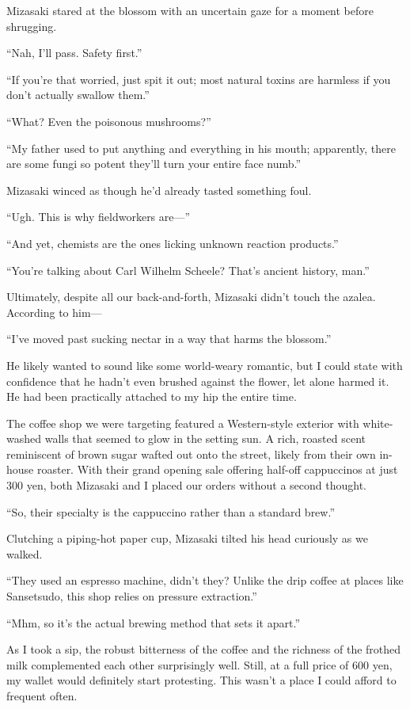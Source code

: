 \documentclass[
    a4paper,
    12pt,
    twoside,
    openany,
    UTF8,
    fontset=windows
]{ctexbook}
\begin{document}
Mizasaki stared at the blossom with an uncertain gaze for a moment before shrugging.

``Nah, I'll pass. Safety first.''

``If you're that worried, just spit it out; most natural toxins are harmless if you don't actually swallow them.''

``What? Even the poisonous mushrooms?''

``My father used to put anything and everything in his mouth; apparently, there are some fungi so potent they'll turn your entire face numb.''

Mizasaki winced as though he'd already tasted something foul.

``Ugh. This is why fieldworkers are---''

``And yet, chemists are the ones licking unknown reaction products.''

``You're talking about Carl Wilhelm Scheele? That's ancient history, man.''

Ultimately, despite all our back-and-forth, Mizasaki didn't touch the azalea. According to him---

``I've moved past sucking nectar in a way that harms the blossom.''

He likely wanted to sound like some world-weary romantic, but I could state with confidence that he hadn't even brushed against the flower, let alone harmed it. He had been practically attached to my hip the entire time.

The coffee shop we were targeting featured a Western-style exterior with white-washed walls that seemed to glow in the setting sun. A rich, roasted scent reminiscent of brown sugar wafted out onto the street, likely from their own in-house roaster. With their grand opening sale offering half-off cappuccinos at just 300 yen, both Mizasaki and I placed our orders without a second thought.

``So, their specialty is the cappuccino rather than a standard brew.''

Clutching a piping-hot paper cup, Mizasaki tilted his head curiously as we walked.

``They used an espresso machine, didn't they? Unlike the drip coffee at places like Sansetsudo, this shop relies on pressure extraction.''

``Mhm, so it's the actual brewing method that sets it apart.''

As I took a sip, the robust bitterness of the coffee and the richness of the frothed milk complemented each other surprisingly well. Still, at a full price of 600 yen, my wallet would definitely start protesting. This wasn't a place I could afford to frequent often.
\end{document}
